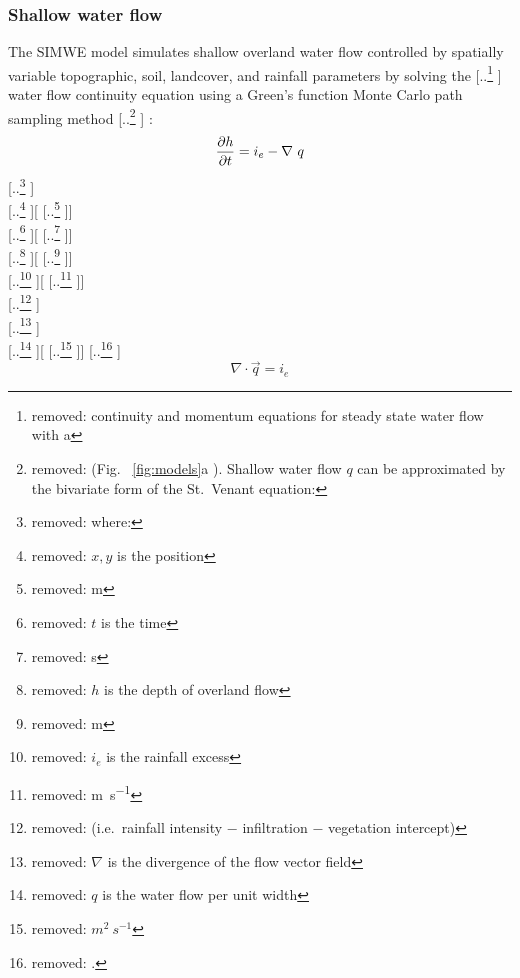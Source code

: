 \documentclass[gmd, manuscript]{copernicus}
\providecommand{\DIFadd}[1]{{\protect\color{blue} \sf #1}} %
\providecommand{\DIFdel}[1]{{\protect\color{red} [..\footnote{removed: #1} ]}} %
\providecommand{\DIFaddbegin}{} %
\providecommand{\DIFaddend}{} %
\providecommand{\DIFdelbegin}{} %
\providecommand{\DIFdelend}{} %
\begin{document}

\subsubsection{Shallow water flow}

The SIMWE model simulates shallow overland water flow
controlled by spatially variable topographic, soil, landcover, 
and rainfall parameters by solving the \DIFdelbegin \DIFdel{continuity and momentum equations 
for steady state water flow with a }\DIFdelend \DIFaddbegin \DIFadd{water flow continuity equation 
using a Green's function Monte Carlo }\DIFaddend path sampling method\DIFdelbegin \DIFdel{(Fig. 
~\ref{fig:models}a ).
Shallow water flow $q$ can be approximated by the bivariate form of the St.~Venant equation:
}\DIFdelend \DIFaddbegin \DIFadd{:
}\DIFaddend %
\DIFdelbegin \begin{displaymath}
{\partial h \over \partial t} =
 i_e - \nabla ~ q
\end{displaymath}
{\DIFdel{\small
\noindent
where: }\\
\DIFdel{\noindent
\hspace*{0.5em} $x, y$ is the position }[\DIFdel{\unit{m}}]\\
\DIFdel{\hspace*{0.5em} $t$ is the time }[\DIFdel{\unit{s}}] \\
\DIFdel{\hspace*{0.5em} $h$ is the depth of overland flow }[\DIFdel{\unit{m}}]\\
\DIFdel{\hspace*{0.5em} $i_e$ is the rainfall excess }[\DIFdel{\unit{m~s^{-1}}}] \\
\DIFdel{\hspace*{0.5em} (i.e.~rainfall intensity $-$ infiltration $-$ vegetation intercept)}\\
\DIFdel{\hspace*{0.5em} $\nabla$ is the divergence of the flow vector field}\\
\DIFdel{\hspace*{0.5em} $q$ is the water flow per unit width }[\DIFdel{$\unit{m}^2~\unit{s}^{-1}$}]\DIFdel{. }\\
}
\DIFdelend \DIFaddbegin \begin{equation}
\label{eq:water}
\nabla \cdot \vec{q} = i_e
\end{equation}
\end{document}
